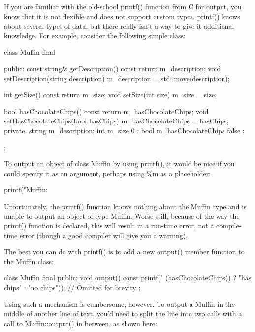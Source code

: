 If you are familiar with the old-school printf() function from C for output, you know that it is not flexible and does not support custom types. printf() knows about several types of data, but there really isn’t a way to give it additional knowledge. For example, consider the following simple class:

\begin{cpp}
class Muffin final
{
    public:
        const string& getDescription() const { return m_description; }
        void setDescription(string description)
        {
            m_description = std::move(description);
        }

        int getSize() const { return m_size; }
        void setSize(int size) { m_size = size; }

        bool hasChocolateChips() const { return m_hasChocolateChips; }
        void setHasChocolateChips(bool hasChips)
        {
            m_hasChocolateChips = hasChips;
        }
    private:
        string m_description;
        int m_size { 0 };
        bool m_hasChocolateChips { false };
};
\end{cpp}

To output an object of class Muffin by using printf(), it would be nice if you could specify it as an argument, perhaps using \%m as a placeholder:

\begin{cpp}
printf("Muffin: %
\end{cpp}

Unfortunately, the printf() function knows nothing about the Muffin type and is unable to output an object of type Muffin. Worse still, because of the way the printf() function is declared, this will result in a run-time error, not a compile-time error (though a good compiler will give you a warning).

The best you can do with printf() is to add a new output() member function to the Muffin class:

\begin{cpp}
class Muffin final
{
    public:
    void output() const
    {
        printf("%
            (hasChocolateChips() ? "has chips" : "no chips"));
    }
    // Omitted for brevity
};
\end{cpp}

Using such a mechanism is cumbersome, however. To output a Muffin in the middle of another line of text, you’d need to split the line into two calls with a call to Muffin::output() in between, as shown here:

